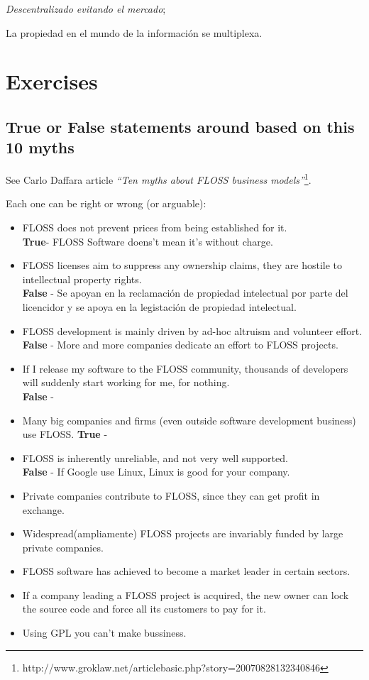 \documentclass[11pt]{scrartcl}
\begin{document}
\emph{Descentralizado evitando el mercado};

La propiedad en el mundo de la información se multiplexa.

\section{Exercises}

\subsection{True or False statements around  based on this 10 myths}

See Carlo Daffara article \emph{“Ten myths about FLOSS business models”}\footnote{http://www.groklaw.net/articlebasic.php?story=20070828132340846}.

Each one can be right or wrong (or arguable):
\begin{itemize}
    \item FLOSS does not prevent prices from being established for it.\\
        \textbf{True}- FLOSS Software doens't mean it's without charge.
    \item FLOSS licenses aim to suppress any ownership claims, they are hostile to intellectual property rights.\\
        \textbf{False} - Se apoyan en la reclamación de propiedad intelectual por parte del licencidor y se apoya en la legistación de propiedad intelectual.
    \item FLOSS development is mainly driven by ad-hoc altruism and volunteer effort.
        \textbf{False} - More and more companies dedicate an effort to FLOSS projects.
    \item If I release my software to the FLOSS community, thousands of developers will suddenly start working for me, for nothing.\\
        \textbf{False} - 
    \item Many big companies and firms (even outside software development business) use FLOSS.
        \textbf{True} - 
    \item FLOSS is inherently unreliable, and not very well supported.\\
        \textbf{False} - If Google use Linux, Linux is good for your company.
    \item Private companies contribute to FLOSS, since they can get profit in exchange.\\
    \item Widespread(ampliamente) FLOSS projects are invariably funded by large private companies.
    \item FLOSS software has achieved to become a market leader in certain sectors.
    \item If a company leading a FLOSS project is acquired, the new owner can lock the source code and force all its customers to pay for it.
    \item Using GPL you can't make bussiness.
\end{itemize}
\end{document}
